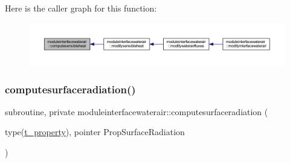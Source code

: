 Here is the caller graph for this function\+:\nopagebreak
\begin{figure}[H]
\begin{center}
\leavevmode
\includegraphics[width=350pt]{namespacemoduleinterfacewaterair_abe46b3644f7d36d7d60cc3a86eb0de5f_icgraph}
\end{center}
\end{figure}
\mbox{\label{namespacemoduleinterfacewaterair_ac9ef1ef38af46f9428d5e550057e60b9}} 
\subsubsection{\texorpdfstring{computesurfaceradiation()}{computesurfaceradiation()}}
{\footnotesize\ttfamily subroutine, private moduleinterfacewaterair\+::computesurfaceradiation (\begin{DoxyParamCaption}\item[{type(\mbox{\hyperlink{structmoduleinterfacewaterair_1_1t__property}{t\+\_\+property}}), pointer}]{Prop\+Surface\+Radiation }\end{DoxyParamCaption})\hspace{0.3cm}{\ttfamily [private]}}

